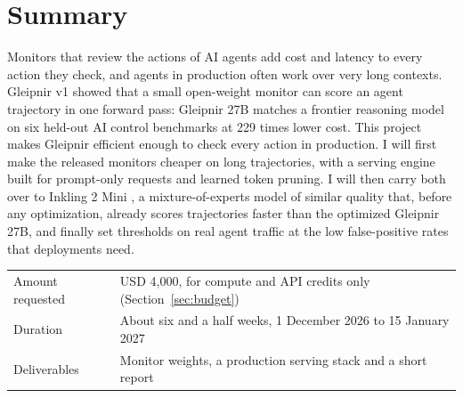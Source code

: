 \section*{Summary}
Monitors that review the actions of AI agents add cost and latency to every
action they check, and agents in production often work over very long contexts.
Gleipnir v1 \citep{ferrao2026gleipnir} showed that a small open-weight
monitor can score an agent trajectory in one forward pass: Gleipnir 27B matches
a frontier reasoning model on six held-out AI control benchmarks at 229 times
lower cost. This project makes Gleipnir efficient enough to check every
action in production. I will first make
the released monitors cheaper on long trajectories, with a serving engine
built for prompt-only requests and learned token pruning. I will then carry
both over to Inkling 2 Mini \citep{inkling2mini}, a mixture-of-experts model
of similar quality that, before any optimization, already scores
trajectories faster than the optimized Gleipnir 27B, and finally set thresholds on real agent traffic at the low
false-positive rates that deployments need.

\begin{tabularx}{\linewidth}{@{}lX@{}}
\toprule
Amount requested & USD 4,000, for compute and API credits only (Section~\ref{sec:budget}) \\
Duration & About six and a half weeks, 1 December 2026 to 15 January 2027 \\
Deliverables & Monitor weights, a production serving stack and a short report \\
\bottomrule
\end{tabularx}
